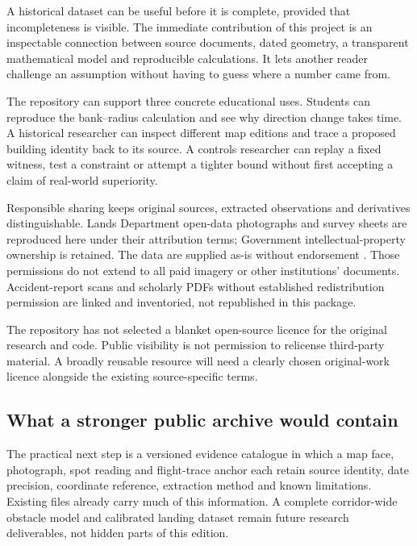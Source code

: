 \label{part:8}
A historical dataset can be useful before it is complete, provided that incompleteness is visible. The immediate contribution of this project is an inspectable connection between source documents, dated geometry, a transparent mathematical model and reproducible calculations. It lets another reader challenge an assumption without having to guess where a number came from.


The repository can support three concrete educational uses. Students can reproduce the bank--radius calculation and see why direction change takes time. A historical researcher can inspect different map editions and trace a proposed building identity back to its source. A controls researcher can replay a fixed witness, test a constraint or attempt a tighter bound without first accepting a claim of real-world superiority.

Responsible sharing keeps original sources, extracted observations and derivatives distinguishable. Lands Department open-data photographs and survey sheets are reproduced here under their attribution terms; Government intellectual-property ownership is retained. The data are supplied as-is without endorsement \cite{dataterms,csditerms}. Those permissions do not extend to all paid imagery or other institutions' documents. Accident-report scans and scholarly PDFs without established redistribution permission are linked and inventoried, not republished in this package.

The repository has not selected a blanket open-source licence for the original research and code. Public visibility is not permission to relicense third-party material. A broadly reusable resource will need a clearly chosen original-work licence alongside the existing source-specific terms.
\clearpage
\subsection*{What a stronger public archive would contain}
The practical next step is a versioned evidence catalogue in which a map face, photograph, spot reading and flight-trace anchor each retain source identity, date precision, coordinate reference, extraction method and known limitations. Existing files already carry much of this information. A complete corridor-wide obstacle model and calibrated landing dataset remain future research deliverables, not hidden parts of this edition.

